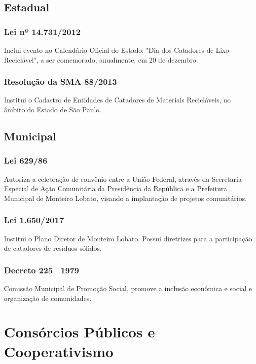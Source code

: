 \begin{subapend}
	\subsection{Estadual}
	\begin{subsubapend}
		\subsubsection{Lei nº 14.731/2012}
		Inclui evento no Calendário Oficial do Estado: "Dia dos Catadores de Lixo Reciclável", a ser comemorado, anualmente, em 20 de dezembro.
		\subsubsection{Resolução da SMA 88/2013}
		Institui o Cadastro de Entidades de Catadores de Materiais Recicláveis, no âmbito do Estado de São Paulo.
		\subsection{Municipal}
		\subsubsection{Lei 629/86}
		Autoriza a celebração de convênio entre a União Federal, através da Secretaria Especial de Ação Comunitária da Presidência da República e a Prefeitura Municipal de Monteiro Lobato, visando a implantação de projetos comunitários.
		\subsubsection{Lei 1.650/2017}
		Institui o Plano Diretor de Monteiro Lobato. Possui diretrizes para a participação de catadores de resíduos sólidos.
		\subsubsection{Decreto 225 \ 1979}
		Comissão Municipal de Promoção Social, promove a inclusão econômica e social e organização de comunidades.
	\end{subsubapend}
\end{subapend}

\section{Consórcios Públicos e Cooperativismo}

